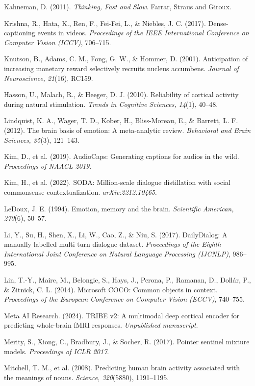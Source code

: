 \documentclass[11pt,letterpaper]{article}
\numberwithin{equation}{section}
\begin{document}
Kahneman, D. (2011). \textit{Thinking, Fast and Slow}. Farrar, Straus and Giroux.

Krishna, R., Hata, K., Ren, F., Fei-Fei, L., \& Niebles, J. C. (2017). Dense-captioning events in videos. \textit{Proceedings of the IEEE International Conference on Computer Vision (ICCV)}, 706--715.

Knutson, B., Adams, C. M., Fong, G. W., \& Hommer, D. (2001). Anticipation of increasing monetary reward selectively recruits nucleus accumbens. \textit{Journal of Neuroscience, 21}(16), RC159.

Hasson, U., Malach, R., \& Heeger, D. J. (2010). Reliability of cortical activity during natural stimulation. \textit{Trends in Cognitive Sciences, 14}(1), 40--48.

Lindquist, K. A., Wager, T. D., Kober, H., Bliss-Moreau, E., \& Barrett, L. F. (2012). The brain basis of emotion: A meta-analytic review. \textit{Behavioral and Brain Sciences, 35}(3), 121--143.

Kim, D., et al. (2019). AudioCaps: Generating captions for audios in the wild. \textit{Proceedings of NAACL 2019}.

Kim, H., et al. (2022). SODA: Million-scale dialogue distillation with social commonsense contextualization. \textit{arXiv:2212.10465}.

LeDoux, J. E. (1994). Emotion, memory and the brain. \textit{Scientific American, 270}(6), 50--57.

Li, Y., Su, H., Shen, X., Li, W., Cao, Z., \& Niu, S. (2017). DailyDialog: A manually labelled multi-turn dialogue dataset. \textit{Proceedings of the Eighth International Joint Conference on Natural Language Processing (IJCNLP)}, 986--995.

Lin, T.-Y., Maire, M., Belongie, S., Hays, J., Perona, P., Ramanan, D., Doll\'{a}r, P., \& Zitnick, C. L. (2014). Microsoft COCO: Common objects in context. \textit{Proceedings of the European Conference on Computer Vision (ECCV)}, 740--755.

Meta AI Research. (2024). TRIBE v2: A multimodal deep cortical encoder for predicting whole-brain fMRI responses. \textit{Unpublished manuscript}.

Merity, S., Xiong, C., Bradbury, J., \& Socher, R. (2017). Pointer sentinel mixture models. \textit{Proceedings of ICLR 2017}.

Mitchell, T. M., et al. (2008). Predicting human brain activity associated with the meanings of nouns. \textit{Science, 320}(5880), 1191--1195.
\end{document}
